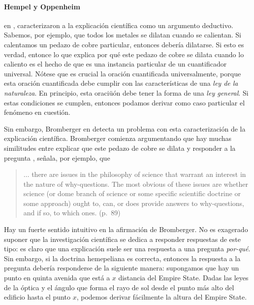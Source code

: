 \paragraph{Hempel y Oppenheim} en ,
caracterizaron a la explicación científica como un argumento
deductivo. Sabemos, por ejemplo, que todos los metales se dilatan
cuando se calientan. Si calentamos un pedazo de cobre particular,
entonces debería dilatarse. Si esto es verdad, entonce lo que
explica por qué este pedazo de cobre se dilata cuando lo caliento es
el hecho de que es una instancia particular de un cuantificador
universal. Nótese que es crucial la oración cuantificada
universalmente, porque esta oración cuantificada debe cumplir con las características de una \emph{ley de la naturaleza}. En principio, esta oraciüón debe tener la forma de
una \emph{ley general}. Si estas condiciones se cumplen, entonces
podamos derivar como caso particular el fenómeno en
cuestión.

Sin embargo, Bromberger en  detecta un
problema con esta caracterización de la explicación científica.
Bromberger comienza argumentando que hay muchas similitudes entre
explicar que este pedazo de cobre se dilata y responder a la
pregunta , señala, por ejemplo, que

\begin{quote}
	$\ldots$ there are issues in the philosophy of science that
	warrant an interest in the nature of why-questions. The most
	obvious of	these issues are whether science (or dome branch of
	science or	some specific scientific doctrine or some approach)
	ought to,	can, or does provide answers to why-questions, and if
	so, to	which ones. (p.~89)
\end{quote}


Hay un fuerte sentido intuitivo en la afirmación de Bromberger. No
es exagerado suponer que la investigación científica se dedica a
responder respuestas de este tipo: es claro que una explicación suele ser una respuesta a una
pregunta \emph{por-qué}. Sin embargo, si la doctrina hemepeliana es
correcta, entonces la  respuesta a la pregunta  debería responderse de la
siguiente manera: supongamos que hay un punto en quinta avenida que
está a $x$ distancia del Empire State. Dadas las leyes de la óptica
y el ángulo que forma el rayo de sol desde el punto más alto del
edificio hasta el punto $x$, podemos derivar fácilmente la altura
del Empire State.

